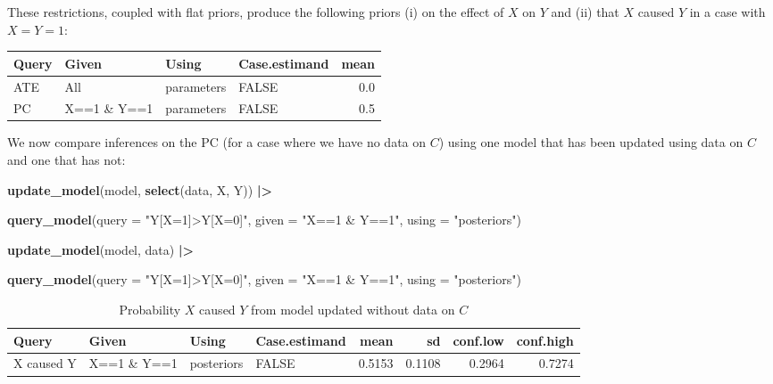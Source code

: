 \documentclass[
  12pt,
]{book}
\newenvironment{Shaded}{\begin{snugshade}}{\end{snugshade}}
\newcommand{\AttributeTok}[1]{\textcolor[rgb]{0.13,0.29,0.53}{#1}}
\newcommand{\FunctionTok}[1]{\textcolor[rgb]{0.13,0.29,0.53}{\textbf{#1}}}
\newcommand{\NormalTok}[1]{#1}
\newcommand{\SpecialCharTok}[1]{\textcolor[rgb]{0.81,0.36,0.00}{\textbf{#1}}}
\newcommand{\StringTok}[1]{\textcolor[rgb]{0.31,0.60,0.02}{#1}}
\begin{document}
These restrictions, coupled with flat priors, produce the following priors (i) on the effect of \(X\) on \(Y\) and (ii) that \(X\) caused \(Y\) in a case with \(X=Y=1\):

\begin{tabular}{l|l|l|l|r}
\hline
Query & Given & Using & Case.estimand & mean\\
\hline
ATE & All & parameters & FALSE & 0.0\\
\hline
PC & X==1 \& Y==1 & parameters & FALSE & 0.5\\
\hline
\end{tabular}

We now compare inferences on the PC (for a case where we have no data on \(C\)) using one model that has been updated using data on \(C\) and one that has not:

\begin{Shaded}
\begin{Highlighting}[]
\FunctionTok{update\_model}\NormalTok{(model, }\FunctionTok{select}\NormalTok{(data, X, Y)) }\SpecialCharTok{|\textgreater{}}
  
  \FunctionTok{query\_model}\NormalTok{(}\AttributeTok{query =} \StringTok{"Y[X=1]\textgreater{}Y[X=0]"}\NormalTok{, }\AttributeTok{given =} \StringTok{"X==1 \& Y==1"}\NormalTok{,}
              \AttributeTok{using =} \StringTok{"posteriors"}\NormalTok{) }

\FunctionTok{update\_model}\NormalTok{(model, data) }\SpecialCharTok{|\textgreater{}}

    \FunctionTok{query\_model}\NormalTok{(}\AttributeTok{query =} \StringTok{"Y[X=1]\textgreater{}Y[X=0]"}\NormalTok{, }\AttributeTok{given =} \StringTok{"X==1 \& Y==1"}\NormalTok{, }
              \AttributeTok{using =} \StringTok{"posteriors"}\NormalTok{) }
\end{Highlighting}
\end{Shaded}

\begin{table}

\caption{\label{tab:unnamed-chunk-81}Probability $X$ caused $Y$ from model updated without data on $C$}
\centering
\begin{tabular}[t]{l|l|l|l|r|r|r|r}
\hline
Query & Given & Using & Case.estimand & mean & sd & conf.low & conf.high\\
\hline
X caused Y & X==1 \& Y==1 & posteriors & FALSE & 0.5153 & 0.1108 & 0.2964 & 0.7274\\
\hline
\end{tabular}
\end{table}
\end{document}
